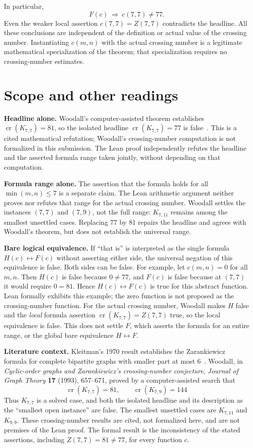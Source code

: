 \documentclass[11pt]{article}
\newcommand{\crn}{\operatorname{cr}}
\begin{document}
In particular,
\[
F(c)\ \Longrightarrow\ c(7,7)\ne77.
\]
Even the weaker local assertion $c(7,7)=Z(7,7)$ contradicts the
headline. All these conclusions are independent of the definition or
actual value of the crossing number. Instantiating $c(m,n)$ with the
actual crossing number is a legitimate mathematical specialization of
the theorem; that specialization requires no crossing-number estimates.

\section{Scope and other readings}\label{sec:scope}
\textbf{Headline alone.} Woodall's computer-assisted theorem establishes
$\crn(K_{7,7})=81$, so the isolated headline $\crn(K_{7,7})=77$ is
false~\cite{woodall}. This is a cited mathematical refutation; Woodall's
crossing-number computation is not formalized in this submission.
The Lean proof independently refutes the headline and the asserted formula
range taken jointly, without depending on that computation.

\textbf{Formula range alone.} The assertion that the formula holds for
all $\min(m,n)\leq7$ is a separate claim. The Lean arithmetic argument
neither proves nor refutes that range for the actual crossing number.
Woodall settles the instances $(7,7)$ and $(7,9)$, not the full range:
$K_{7,11}$ remains among the smallest unsettled cases. Replacing $77$
by $81$ repairs the headline and agrees with Woodall's theorem, but does
not establish the universal range.

\textbf{Bare logical equivalence.} If ``that is'' is interpreted as the
single formula $H(c)\leftrightarrow F(c)$ without asserting either side,
the universal negation of this equivalence is false. Both sides can be
false. For example, let $c(m,n)=0$ for all $m,n$. Then $H(c)$ is false
because $0\ne77$, and $F(c)$ is false because at $(7,7)$ it would require
$0=81$. Hence $H(c)\leftrightarrow F(c)$ is true for this abstract
function. Lean formally exhibits this example; the zero function is
not proposed as the crossing-number function. For the actual crossing
number, Woodall makes $H$ false and the \emph{local} formula assertion
$\crn(K_{7,7})=Z(7,7)$ true, so the local equivalence is false.
This does not settle $F$, which asserts the formula for an entire range,
or the global bare equivalence $H\leftrightarrow F$.

\textbf{Literature context.} Kleitman's 1970 result establishes the
Zarankiewicz formula for complete bipartite graphs with smaller part at
most $6$~\cite{kleitman}. Woodall, in \emph{Cyclic-order graphs and
Zarankiewicz's crossing-number conjecture}, \emph{Journal of Graph Theory}
\textbf{17} (1993), 657--671, proved by a computer-assisted search
that~\cite{woodall}
\[
\crn(K_{7,7})=81,\qquad \crn(K_{7,9})=144
\]
Thus $K_{7,7}$ is a solved case, and both the isolated
headline and its description as the ``smallest open instance'' are false.
The smallest unsettled cases are $K_{7,11}$ and $K_{9,9}$.
These crossing-number results are cited, not formalized here, and are not
premises of the Lean proof. The formal result is the inconsistency of
the stated assertions, including $Z(7,7)=81\ne77$, for every function $c$.
\end{document}
